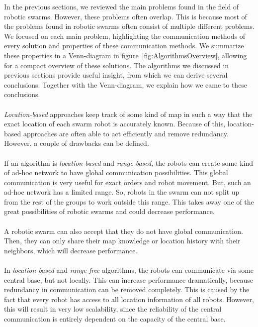 

In the previous sections, we reviewed the main problems found in the field of robotic swarms.
However, these problems often overlap.
This is because most of the problems found in robotic swarms often consist of multiple different problems.
We focused on each main problem, highlighting the communication methods of every solution and properties of these communication methods.
We summarize these properties in a Venn-diagram in figure~\ref{fig:AlgorithmsOverview}, allowing for a compact overview of these solutions.
The algorithms we discussed in previous sections provide useful insight, from which we can derive several conclusions.
Together with the Venn-diagram, we explain how we came to these conclusions.\\
\\
\emph{Location-based} approaches keep track of some kind of map in such a way that the exact location of each swarm robot is accurately known.
Because of this, location-based approaches are often able to act efficiently and remove redundancy.
However, a couple of drawbacks can be defined.\\
\\
If an algorithm is \emph{location-based} and \emph{range-based}, the robots can create some kind of ad-hoc network to have global communication possibilities.
This global communication is very useful for exact orders and robot movement.
But, such an ad-hoc network has a limited range.
So, robots in the swarm can not split up from the rest of the groups to work outside this range.
This takes away one of the great possibilities of robotic swarms and could decrease performance.\\
\\
A robotic swarm can also accept that they do not have global communication.
Then, they can only share their map knowledge or location history with their neighbors, which will decrease performance.\\
\\
In \emph{location-based} and \emph{range-free} algorithms, the robots can communicate via some central base, but not locally. 
This can increase performance dramatically, because redundancy in communication can be removed completely.
This is caused by the fact that every robot has access to all location information of all robots.
However, this will result in very low scalability, since the reliability of the central communication is entirely dependent on the capacity of the central base.\\

